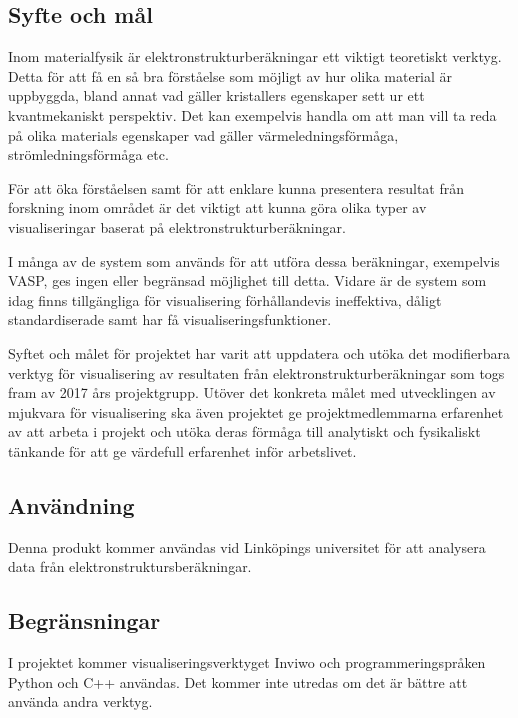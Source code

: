 \documentclass[a4paper,12pt]{article}
\begin{document}
\subsection{Syfte och mål}
Inom materialfysik är elektronstrukturberäkningar ett viktigt teoretiskt verktyg. Detta för att få en så bra förståelse som möjligt av hur olika material är uppbyggda, bland annat vad gäller kristallers egenskaper sett ur ett kvantmekaniskt perspektiv. Det kan exempelvis handla om att man vill ta reda på olika materials egenskaper vad gäller värmeledningsförmåga, strömledningsförmåga etc.

För att öka förståelsen samt för att enklare kunna presentera resultat från forskning inom området är det viktigt att kunna göra olika typer av visualiseringar baserat på elektronstrukturberäkningar.

I många av de system som används för att utföra dessa beräkningar, exempelvis VASP, ges ingen eller begränsad möjlighet till detta. Vidare är de system som idag finns tillgängliga för visualisering förhållandevis ineffektiva, dåligt standardiserade samt har få visualiseringsfunktioner.

Syftet och målet för projektet har varit att uppdatera och utöka det modifierbara verktyg för visualisering av resultaten från elektronstrukturberäkningar som togs fram av 2017 års projektgrupp. Utöver det konkreta målet med utvecklingen av mjukvara för visualisering ska även projektet ge projektmedlemmarna erfarenhet av att arbeta i projekt och utöka deras förmåga till analytiskt och fysikaliskt tänkande för att ge värdefull erfarenhet inför arbetslivet.

\subsection{Användning}
Denna produkt kommer användas vid Linköpings universitet för att analysera data från elektronstruktursberäkningar.

\subsection{Begränsningar}
I projektet kommer visualiseringsverktyget Inviwo och
programmeringspråken Python och C++ användas. Det kommer inte utredas
om det är bättre att använda andra verktyg.
\end{document}
